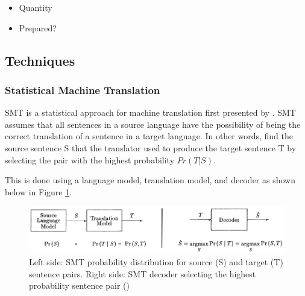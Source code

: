 \begin{itemize}
    \item Quantity
    \item Prepared?
\end{itemize}

\clearpage
\subsection{Techniques}

\subsubsection{Statistical Machine Translation}



\acrfull{SMT} is a statistical approach for machine translation first presented by \cite{brown_statistical_1990}. 
\acrshort{SMT} assumes that all sentences in a source language have the possibility of being the correct translation of a sentence in a target language. 
In other words, find the source sentence S that the translator used to produce the target sentence T by selecting the pair with the highest probability $Pr ( T | S )$.

This is done using a language model, translation model, and decoder
as shown below in Figure \ref{fig:smt_diagram}.

\begin{figure}[ht!]
\centering
\includegraphics[width=1\textwidth]{media/literature/machine_translation/smt_3.png}
\caption[Diagram of \acrshort{SMT} probability distribution and decoder]{Left side: \acrshort{SMT} probability distribution for source (S) and target (T) sentence pairs. Right side: \acrshort{SMT} decoder selecting the highest probability sentence pair (\cite{brown_statistical_1990})}
\label{fig:smt_diagram}
\end{figure}




